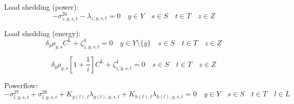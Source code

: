\documentclass{article}
\newcommand{\sYears}{Y}
\newcommand{\sScenarios}{S}
\newcommand{\sIntervals}{T}
\newcommand{\sZones}{Z}
\newcommand{\sLinks}{L}
\newcommand{\iYear}{y}
\newcommand{\iYearTerminal}{\overline{\iYear}}
\newcommand{\iScenario}{s}
\newcommand{\iInterval}{t}
\newcommand{\iZone}{z}
\newcommand{\iLink}{l}
\newcommand{\cScenarioDuration}[1][\iYear,\iScenario]{\rho_{#1}}
\newcommand{\cInterestRate}{i}
\newcommand{\cIncidenceMatrix}[1][\iZone,\iLink]{K_{#1}}
\newcommand{\cLostLoadCost}{C^{\mathrm{L}}}
\newcommand{\cDiscountRate}[1][\iYear]{\delta_{#1}}
\newcommand{\dNonNegativeLostLoad}[1][\iZone,\iYear,\iScenario,\iInterval]{\sigma_{#1}^{26}}
\newcommand{\dMinPowerFlow}[1][\iLink,\iYear,\iScenario,\iInterval]{\sigma_{#1}^{27}}
\newcommand{\dMaxPowerFlow}[1][\iLink,\iYear,\iScenario,\iInterval]{\sigma_{#1}^{28}}
\newcommand{\dPowerBalance}[1][\iZone,\iYear,\iScenario,\iInterval]{\lambda_{#1}}
\newcommand{\dLostLoadEnergy}[1][\iZone,\iYear,\iScenario,\iInterval]{\zeta_{#1}^{4}}
\begin{document}
Load shedding (power):
\begin{equation}
- \dNonNegativeLostLoad - \dPowerBalance = 0 \quad \iYear \in \sYears \quad \iScenario \in \sScenarios \quad \iInterval \in \sIntervals \quad \iZone \in \sZones
\end{equation}

Load shedding (energy):
\begin{equation}
\cDiscountRate \cScenarioDuration \cLostLoadCost + \dLostLoadEnergy = 0 \quad \iYear \in \sYears \setminus \{\iYearTerminal\} \quad \iScenario \in \sScenarios \quad \iInterval \in \sIntervals \quad \iZone \in \sZones
\end{equation}

\begin{equation}
\cDiscountRate[\iYearTerminal] \cScenarioDuration[\iYearTerminal,\iScenario] \left[1 + \frac{1}{\cInterestRate}\right] \cLostLoadCost + \dLostLoadEnergy[\iZone,\iYearTerminal,\iScenario,\iInterval] = 0 \quad \iScenario \in \sScenarios \quad \iInterval \in \sIntervals \quad \iZone \in \sZones
\end{equation}

Powerflow:
\begin{equation}
-\dMinPowerFlow + \dMaxPowerFlow + \cIncidenceMatrix[g(\iLink), \iLink] \dPowerBalance[g(\iLink),\iYear,\iScenario,\iInterval] + \cIncidenceMatrix[h(\iLink), \iLink] \dPowerBalance[h(\iLink),\iYear,\iScenario,\iInterval] = 0 \quad \iYear \in \sYears \quad \iScenario \in \sScenarios \quad \iInterval \in \sIntervals \quad \iLink \in \sLinks
\end{equation}

\end{document}

